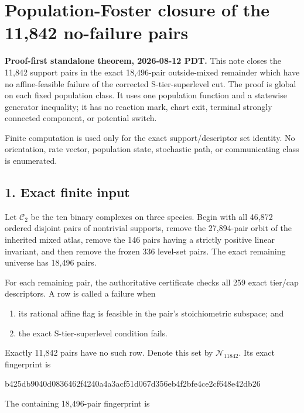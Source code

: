 \section{Population-Foster closure of the 11,842 no-failure
pairs}

\textbf{Proof-first standalone theorem, 2026-08-12 PDT.} This note
closes the 11,842 support pairs in the exact 18,496-pair outside-mixed
remainder which have no affine-feasible failure of the corrected
S-tier-superlevel cut. The proof is global on each fixed population
class. It uses one population function and a statewise generator
inequality; it has no reaction mark, chart exit, terminal strongly
connected component, or potential switch.

Finite computation is used only for the exact support/descriptor set
identity. No orientation, rate vector, population state, stochastic
path, or communicating class is enumerated.

\subsection{1. Exact finite input}

Let \(\mathcal C_2\) be the ten binary complexes on three species. Begin
with all 46,872 ordered disjoint pairs of nontrivial supports, remove
the 27,894-pair orbit of the inherited mixed atlas, remove the 146 pairs
having a strictly positive linear invariant, and then remove the frozen
336 level-set pairs. The exact remaining universe has 18,496 pairs.

For each remaining pair, the authoritative certificate checks all 259
exact tier/cap descriptors. A row is called a failure when

\begin{enumerate}
\def\labelenumi{\arabic{enumi}.}
\tightlist
\item
  its rational affine flag is feasible in the pair's stoichiometric
  subspace; and
\item
  the exact S-tier-superlevel condition fails.
\end{enumerate}

Exactly 11,842 pairs have no such row. Denote this set by
\(\mathcal N_{11842}\). Its exact fingerprint is

\begin{CodeBlock}
b425db9040d0836462f4240a4a3acf51d067d356eb4f2bfe4ce2cf648e42db26
\end{CodeBlock}

The containing 18,496-pair fingerprint is

